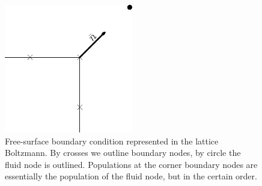 \documentclass{article}
\begin{document}
\begin{figure}
\includegraphics[width=0.5\textwidth]{Figures/free_surface.eps}
\caption{Free-surface boundary condition represented in the lattice Boltzmann. By crosses we outline
boundary nodes, by circle the fluid node is outlined. Populations at the corner boundary nodes are
essentially the population of the fluid node, but in the certain order. \label{fig:free:surface}}
\end{figure}


\end{document}
